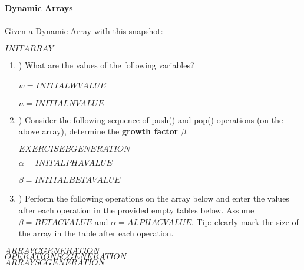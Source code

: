    \textbf{\LARGE{\color{tumgadRed} Dynamic Arrays}}\\
    \\
    \noindent
    Given a Dynamic Array with this snapshot:
    \begin{center}
        $INITARRAY$
    \end{center}
    \begin{enumerate}[label=\alph*]
        \item \hspace{-5px}) What are the values of the following variables?\\
        \\
        \color{tumgadRed}
        $w = INITIALWVALUE$\\
        \\
        $n = INITIALNVALUE$
        \\
        \color{black}
        \item \hspace{-5px}) Consider the following sequence of push() and pop() operations (on the above array), determine the \textbf{growth factor $\beta$}.
        \begin{center}
            $EXERCISEBGENERATION$
        \end{center}
        \color{tumgadRed}
        $\alpha = INITALPHAVALUE$\\
        \\
        $\beta = INITIALBETAVALUE$\\
        \color{black}
        \item \hspace{-5px}) Perform the following operations on the array below and enter the values after each operation in the provided empty
        tables below. Assume $\beta = BETACVALUE$ and $\alpha = ALPHACVALUE$. Tip: clearly mark the size of the array in the table after each operation.
    \end{enumerate}
    \begin{center}
        $ARRAYCGENERATION$\\
        \color{tumgadRed}
        $OPERATIONSCGENERATION$\\
        $ARRAYSCGENERATION$
        \color{black}
    \end{center}
